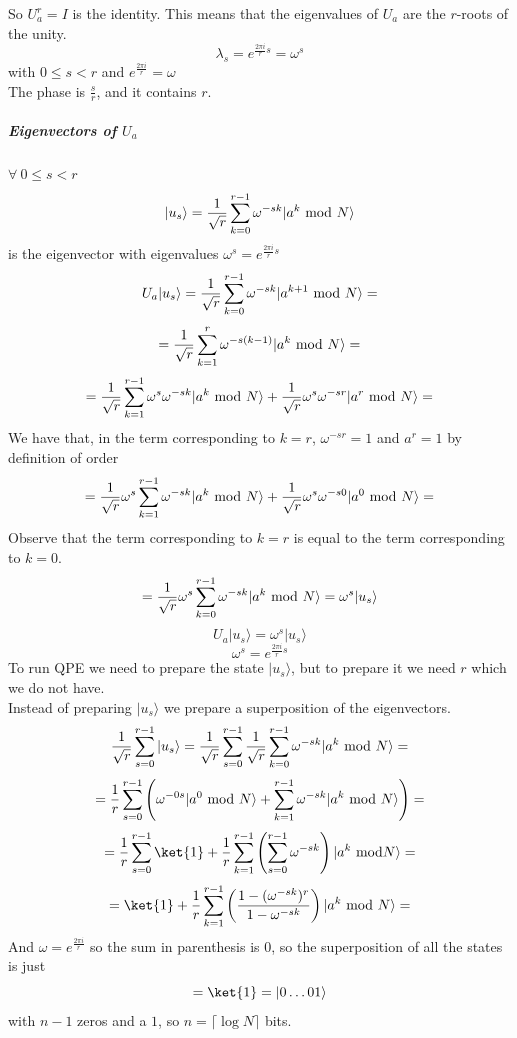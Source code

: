 \documentclass[10pt]{report}
\begin{document}
So $U_a^r = I$ is the identity. This means that the eigenvalues of $U_a$ are the $r$-roots of the unity.
$$\lambda_s = e^{\frac{2\pi i}{r}s} = \omega^s$$ with $0\leq s<r$ and $e^{\frac{2\pi i}{r}} = \omega$\\
The phase is $\frac{s}{r}$, and it contains $r$.
\subparagraph{Eigenvectors of $U_a$} $\forall\:0\leq s< r$ $$|u_s\rangle = \frac{1}{\sqrt{r}}\sum_{k=0}^{r-1}\omega^{-sk}|a^k\hbox{ mod }N\rangle$$
is the eigenvector with eigenvalues $\omega^s = e^{\frac{2\pi i}{r}s}$\\
$$U_a|u_s\rangle = \frac{1}{\sqrt{r}}\sum_{k=0}^{r-1}\omega^{-sk}|a^{k+1}\hbox{ mod }N\rangle =$$ $$= \frac{1}{\sqrt{r}}\sum_{k=1}^{r}\omega^{-s(k-1)}|a^k\hbox{ mod }N\rangle =$$ $$=\frac{1}{\sqrt{r}}\sum_{k=1}^{r-1}\omega^s\omega^{-sk}|a^k\hbox{ mod }N\rangle + \frac{1}{\sqrt{r}}\omega^s\omega^{-sr}|a^r\hbox{ mod }N\rangle= $$ We have that, in the term corresponding to $k=r$, $\omega^{-sr}=1$ and $a^r=1$ by definition of order $$=\frac{1}{\sqrt{r}}\omega^s\sum_{k=1}^{r-1} \omega^{-sk}|a^k\hbox{ mod }N\rangle + \frac{1}{\sqrt{r}}\omega^s\omega^{-s0}|a^0\hbox{ mod }N\rangle  =$$ Observe that the term corresponding to $k=r$ is equal to the term corresponding to $k=0$.
$$=\frac{1}{\sqrt{r}}\omega^s\sum_{k=0}^{r-1}\omega^{-sk}|a^k\hbox{ mod }N\rangle = \omega^s|u_s\rangle$$
$$U_a|u_s\rangle = \omega^s|u_s\rangle$$
$$\omega^s=e^{\frac{2\pi i}{r}s}$$
To run QPE we need to prepare the state $|u_s\rangle$, but to prepare it we need $r$ which we do not have.\\
Instead of preparing $|u_s\rangle$ we prepare a superposition of the eigenvectors.
$$\frac{1}{\sqrt{r}}\sum_{s=0}^{r-1}|u_s\rangle =\frac{1}{\sqrt{r}}\sum_{s=0}^{r-1}\frac{1}{\sqrt{r}}\sum_{k=0}^{r-1}\omega^{-sk}|a^k\hbox{ mod }N\rangle =$$
$$ = \frac{1}{r}\sum_{s=0}^{r-1}\left( \omega^{-0s}|a^0\hbox{ mod }N\rangle+\sum_{k=1}^{r-1}\omega^{-sk}|a^k\hbox{ mod }N\rangle \right) =$$
$$= \frac{1}{r}\sum_{s=0}^{r-1}\ket{1}+\frac{1}{r}\sum_{k=1}^{r-1}\left(\sum_{s=0}^{r-1}\omega^{-sk}\right)|a^k\hbox{ mod} N\rangle =$$
$$=\ket{1} + \frac{1}{r}\sum_{k=1}^{r-1}\left(\frac{1-(\omega^{-sk})^r}{1-\omega^{-sk}}\right)|a^k\hbox{ mod }N\rangle =$$
And $\omega = e^{\frac{2\pi i}{r}}$ so the sum in parenthesis is $0$, so the superposition of all the states is just 
$$=\ket{1} = |0\ldots01\rangle$$
with $n-1$ zeros and a $1$, so $n=\lceil\log N\rceil$ bits.
\end{document}
